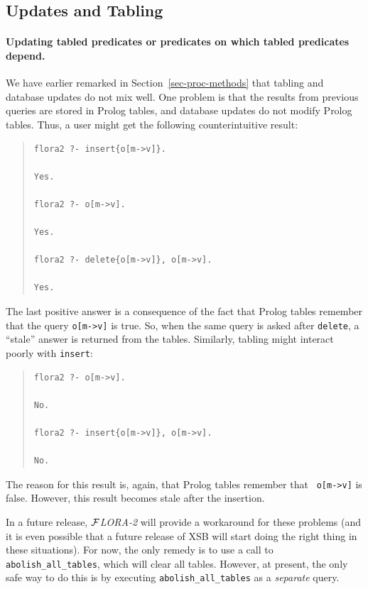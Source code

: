 \documentclass[11pt]{article}
\newcommand{\FLORA}{{\mbox{${\cal F}${\small\it LORA}\rm\emph{-2}}}\xspace}
\begin{document}
\subsection{Updates and Tabling}

\paragraph{Updating tabled predicates or predicates on which tabled
predicates depend.}
We have earlier remarked in Section~\ref{sec-proc-methods} that tabling and
database updates do not mix well.  One problem is that the results from
previous queries are stored in Prolog tables, and database updates do not
modify Prolog tables.  Thus, a user might get the following counterintuitive
result:
\begin{quote}
\begin{verbatim}
flora2 ?- insert{o[m->v]}.

Yes.

flora2 ?- o[m->v].

Yes.

flora2 ?- delete{o[m->v]}, o[m->v].

Yes.
\end{verbatim}
\end{quote}
The last positive answer is a consequence of the fact that Prolog tables
remember that the query {\tt o[m->v]} is true. So, when the same query is
asked after {\tt delete}, a ``stale'' answer is returned from the tables.
Similarly, tabling might interact poorly with {\tt insert}:
\begin{quote}
\begin{verbatim}
flora2 ?- o[m->v].

No.

flora2 ?- insert{o[m->v]}, o[m->v].

No.
\end{verbatim}
\end{quote}
The reason for this result is, again, that Prolog tables remember that {\tt
  o[m->v]} is false. However, this result becomes stale after the
insertion.

In a future release, \FLORA will provide a workaround for these
problems (and it is even possible that a future release of XSB will
start doing the right thing in these situations). For now, the only
remedy is to use a call to {\tt abolish\_all\_tables}, which will
clear all tables.  However, at present, the only safe way to do this
is by executing {\tt abolish\_all\_tables} as a \emph{separate} query.
\end{document}
